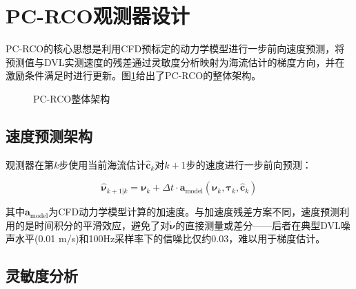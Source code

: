 \section{PC-RCO观测器设计}

PC-RCO的核心思想是利用CFD预标定的动力学模型进行一步前向速度预测，将预测值与DVL实测速度的残差通过灵敏度分析映射为海流估计的梯度方向，并在激励条件满足时进行更新。图\ref{fig:architecture}给出了PC-RCO的整体架构。

\begin{figure}[t]
\centering
{}
\caption{PC-RCO整体架构}
\label{fig:architecture}
\end{figure}

\subsection{速度预测架构}

观测器在第$k$步使用当前海流估计$\hat{\bm{c}}_k$对$k+1$步的速度进行一步前向预测：

\begin{equation}
    \hat{\bm{\nu}}_{k+1|k} = \bm{\nu}_k + \Delta t \cdot \bm{a}_{\text{model}}(\bm{\nu}_k, \bm{\tau}_k, \hat{\bm{c}}_k)
    \label{eq:prediction}
\end{equation}

其中$\bm{a}_{\text{model}}$为CFD动力学模型计算的加速度。与加速度残差方案不同，速度预测利用的是时间积分的平滑效应，避免了对$\dot{\bm{\nu}}$的直接测量或差分——后者在典型DVL噪声水平(0.01 m/s)和100Hz采样率下的信噪比仅约0.03，难以用于梯度估计。

\subsection{灵敏度分析}

